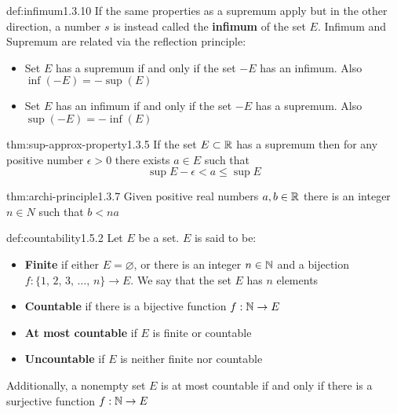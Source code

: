 \documentclass[landscape, 8pt]{extarticle}
\begin{document}
\begin{multicols}{3}
\begin{dfn}[Infimum]{def:infimum}{1.3.10}
If the same properties as a supremum apply but in the other direction, a number $s$ is instead called the \textbf{infimum} of the set $E$. Infimum and Supremum are related via the reflection principle:
\renewcommand\labelitemi{\tiny$\bullet$}
\begin{itemize}
    \setlength\itemsep{0em}
    \item Set $E$ has a supremum if and only if the set $-E$ has an infimum. Also $\inf (-E) = -\sup(E)$
    \item Set $E$ has an infimum if and only if the set $-E$ has a supremum. Also $\sup (-E) = -\inf(E)$
\end{itemize}
\end{dfn}

\begin{thm}{thm:sup-approx-property}{1.3.5}
If the set $E \subset \mathbb{R}$ has a supremum then for any positive number $\epsilon > 0$ there exists $a \in E$ such that
\[\sup E - \epsilon < a \le \sup E\]
\end{thm}
\vspace{-5pt}


\begin{thm}{thm:archi-principle}{1.3.7}
Given positive real numbers $a,b\in \mathbb{R}$ there is an integer $n \in N$ such that $b<na$
\end{thm}
\vspace{-5pt}

\begin{dfn}[Countability]{def:countability}{1.5.2}
Let $E$ be a set. $E$ is said to be:
\vspace{-5pt}
\renewcommand\labelitemi{\tiny$\bullet$}
\begin{itemize}
    \setlength\itemsep{0em}
    \item \textbf{Finite} if either $E=\varnothing$, or there is an integer $n\in \mathbb{N}$ and a bijection $f : \{1,\, 2,\, 3,\, \dots ,\, n\} \to E$. We say that the set $E$ has $n$ elements
    \item \textbf{Countable} if there is a bijective function $f:\mathbb{N}\to E$
    \item \textbf{At most countable} if $E$ is finite or countable
    \item \textbf{Uncountable} if $E$ is neither finite nor countable
\end{itemize}
Additionally, a nonempty set $E$ is at most countable if and only if there is a surjective function $f:\mathbb{N}\to E$
\end{dfn}


\end{multicols}
\end{document}
